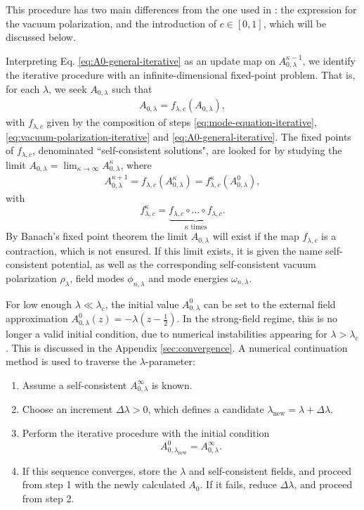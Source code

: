 This procedure has two main differences from the one used in \cite{ambjorn_properties_1983}: the expression for the vacuum polarization, and the introduction of $c \in [0,1]$, which will be discussed below.

Interpreting Eq. \eqref{eq:A0-general-iterative} as an update map on $A_{0,\lambda}^{\kappa-1}$, we identify the iterative procedure with an infinite-dimensional fixed-point problem. That is, for each $\lambda$, we seek $A_{0,\lambda}$ such that
\begin{align}
A_{0,\lambda} = f_{\lambda, c}(A_{0,\lambda}),
\label{eq:fixed-point-problem}
\end{align}
with $f_{\lambda, c}$ given by the composition of steps \eqref{eq:mode-equation-iterative}, \eqref{eq:vacuum-polarization-iterative} and \eqref{eq:A0-general-iterative}.
The fixed points of $f_{\lambda, c}$, denominated ``self-consistent solutions", are looked for by studying the limit $A_{0,\lambda}=\lim_{\kappa\to \infty}A_{0,\lambda}^{\kappa}$, where 
\begin{align}
    A_{0,\lambda}^{\kappa + 1} = f_{\lambda, c}(A_{0,\lambda}^{\kappa}) =
    f_{\lambda, c}^{\kappa}\left(A_{0, \lambda}^{0} \right), 
    \label{eq:self-consistent-limit}
\end{align}
    with $$f_{\lambda, c}^\kappa =
    \underbrace{f_{\lambda, c} \circ ... \circ f_{\lambda, c}}_{\kappa \textrm{ times}}.$$
By Banach's fixed point theorem \cite{banachOperationsDansEnsembles1922} the limit $A_{0, \lambda}$ will exist if the map $f_{\lambda,c}$ is a contraction, which is not ensured. If this limit exists, it is given the name
self-consistent potential, as well as the corresponding self-consistent vacuum
polarization $\rho_{\lambda}$, field modes $\phi_{n,
\lambda}$ and mode energies $\omega_{n, \lambda}$.

For low enough $\lambda\ll \lambda_c$, the initial value  $A_{0,
\lambda}^0$  can be set to the external field approximation \linebreak $A_{0,
\lambda}^0(z) = -\lambda \left(z- \frac{1}{2}\right).$ In the strong-field regime, this is no longer a valid initial condition, due to numerical instabilities appearing for $\lambda>\lambda_c$. This is discussed in the Appendix \ref{sec:convergence}. A numerical continuation method is used to traverse the $\lambda$-parameter:
\begin{enumerate}
    \item Assume a self-consistent $A_{0,\lambda}^\infty$ is known.
    \item Choose an increment $\Delta \lambda>0$, which defines a candidate $\lambda_{\text{new}} = \lambda + \Delta \lambda$.
    \item Perform the iterative procedure with the initial condition $$A_{0, \lambda_{\text{new}}}^0 = A_{0, \lambda}^\infty.$$
    \item If this sequence converges, store the $\lambda$ and self-consistent fields, and proceed from step 1 with the newly calculated $A_0$. If it fails, reduce $\Delta \lambda$, and proceed from step 2.  
\end{enumerate}


